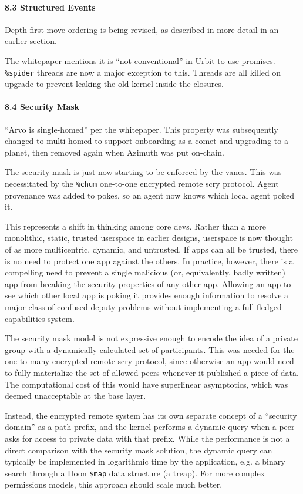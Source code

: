 \documentclass[twoside]{article}
\begin{document}
\paragraph{8.3 Structured Events}  Depth-first move ordering is being revised, as described in more detail in an earlier section.

The whitepaper mentions it is ``not conventional'' in Urbit to use promises.  \lstinline[style=inlinecode]{%spider} threads are now a major exception to this.  Threads are all killed on upgrade to prevent leaking the old kernel inside the closures.

\paragraph{8.4 Security Mask}  ``Arvo is single-homed'' per the whitepaper.  This property was subsequently changed to multi-homed to support onboarding as a comet and upgrading to a planet, then removed again when Azimuth was put on-chain.

The security mask is just now starting to be enforced by the vanes.  This was necessitated by the \lstinline[style=inlinecode]{%chum} one-to-one encrypted remote scry protocol.  Agent provenance was added to pokes, so an agent now knows which local agent poked it.

This represents a shift in thinking among core devs.  Rather than a more monolithic, static, trusted userspace in earlier designs, userspace is now thought of as more multicentric, dynamic, and untrusted.  If apps can all be trusted, there is no need to protect one app against the others.  In practice, however, there is a compelling need to prevent a single malicious (or, equivalently, badly written) app from breaking the security properties of any other app.  Allowing an app to see which other local app is poking it provides enough information to resolve a major class of confused deputy problems without implementing a full-fledged capabilities system.

The security mask model is not expressive enough to encode the idea of a private group with a dynamically calculated set of participants.  This was needed for the one-to-many encrypted remote scry protocol, since otherwise an app would need to fully materialize the set of allowed peers whenever it published a piece of data.  The computational cost of this would have superlinear asymptotics, which was deemed unacceptable at the base layer.

Instead, the encrypted remote system has its own separate concept of a ``security domain'' as a path prefix, and the kernel performs a dynamic query when a peer asks for access to private data with that prefix.  While the performance is not a direct comparison with the security mask solution, the dynamic query can typically be implemented in logarithmic time by the application, e.g. a binary search through a Hoon \lstinline[style=inlinecode]{$map} data structure (a treap).  For more complex permissions models, this approach should scale much better.
\end{document}
